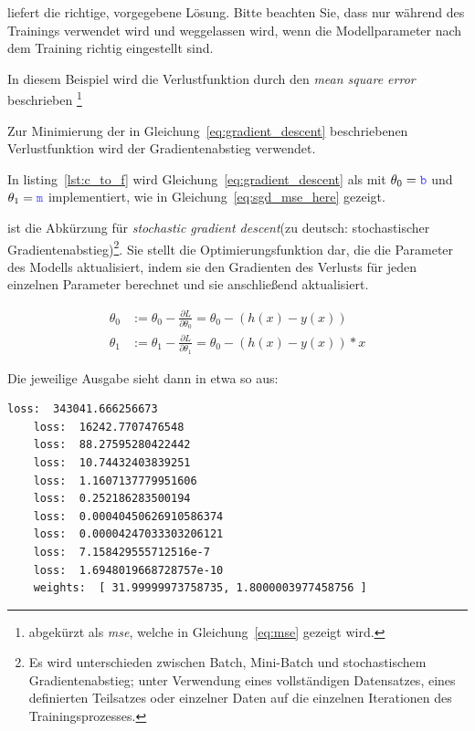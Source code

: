  liefert die richtige, vorgegebene Lösung.
Bitte beachten Sie, dass  nur während des Trainings verwendet wird und weggelassen wird, wenn die Modellparameter nach dem Training richtig eingestellt sind.

In diesem Beispiel wird die Verlustfunktion durch den \textit{mean square error } beschrieben \footnote{ abgekürzt als \textit{mse}, welche in Gleichung~\eqref{eq:mse} gezeigt wird.}

Zur Minimierung der in Gleichung~\eqref{eq:gradient_descent} beschriebenen Verlustfunktion wird der Gradientenabstieg verwendet.

In listing~\ref{lst:c_to_f} wird Gleichung~\eqref{eq:gradient_descent} als  mit $\theta_0 = \code{b}$ und $\theta_1= \code{m}$ implementiert, wie in Gleichung~\eqref{eq:sgd_mse_here} gezeigt.

 ist die Abkürzung für \textit{stochastic gradient descent}(zu deutsch: stochastischer Gradientenabstieg)\footnote{Es wird unterschieden zwischen Batch, Mini-Batch und stochastischem Gradientenabstieg; unter Verwendung eines vollständigen Datensatzes, eines definierten Teilsatzes oder einzelner Daten auf die einzelnen Iterationen des Trainingsprozesses.}.
Sie stellt die Optimierungsfunktion dar, die die Parameter des Modells aktualisiert, indem sie den Gradienten des Verlusts für jeden einzelnen Parameter berechnet und sie anschließend aktualisiert.

\begin{equation}
    \begin{split}
        \theta_{0} & := \theta_{0} - \frac{\partial L}{\partial \theta_{0}} =
        \theta_{0} - (h(x) - y(x))  \\
        \theta_{1} & := \theta_{1} - \frac{\partial L}{\partial \theta_{1}} =
        \theta_{0} - (h(x) - y(x)) * x
    \end{split}
    \label{eq:sgd_mse_here}
\end{equation}

Die jeweilige Ausgabe sieht dann in etwa so aus:
\begin{lstlisting}[caption={Output des C to F Konverters}]
    loss:  343041.666256673
    loss:  16242.7707476548
    loss:  88.27595280422442
    loss:  10.74432403839251
    loss:  1.1607137779951606
    loss:  0.252186283500194
    loss:  0.00040450626910586374
    loss:  0.00004247033303206121
    loss:  7.158429555712516e-7
    loss:  1.6948019668728757e-10
    weights:  [ 31.99999973758735, 1.8000003977458756 ]
\end{lstlisting}

